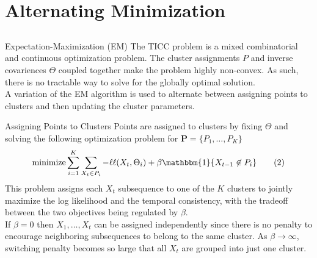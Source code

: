 \documentclass{beamer}
\begin{document}

\section{Alternating Minimization}
\subsection{}

\begin{frame}{Expectation-Maximization (EM)}
	The TICC problem is a mixed combinatorial and continuous optimization problem. The cluster assignments $P$ and inverse covariences $\Theta$ coupled together make the problem highly non-convex. As such, there is no tractable way to solve for the globally optimal solution. \\
	\vspace{.5cm}
	A variation of the EM algorithm is used to alternate between assigning points to clusters and then updating the cluster parameters.
\end{frame}


\begin{frame}{Assigning Points to Clusters}
	Points are assigned to clusters by fixing $\Theta$ and solving the following optimization problem for $\boldsymbol{P} = \{P_1, \dots, P_K\}$
	\begin{align*}
		\text{minimize}\sum\limits_{i=1}^K\sum\limits_{X_t \in P_i} -\ell\ell(X_t, \Theta_i) + \beta\mathbbm{1}\{X_{t-1} \not\in P_i\} \tag{2}
	\end{align*}
	This problem assigns each $X_t$ subsequence to one of the $K$ clusters to jointly maximize the log likelihood and the temporal consistency, with the tradeoff between the two objectives being regulated by $\beta$. \\
	\vspace{.5cm}
	If $\beta = 0$ then $X_1, \dots, X_t$ can be assigned independently since there is no penalty to encourage neighboring subsequences to belong to the same cluster. As $\beta \rightarrow \infty$, switching penalty becomes so large that all $X_t$ are grouped into just one cluster.
\end{frame}

\end{document}
